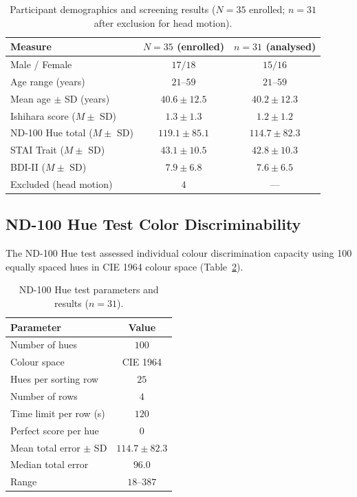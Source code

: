 \documentclass[11pt]{article}
\begin{document}
\begin{table}[H]
\centering
\caption{Participant demographics and screening results ($N = 35$ enrolled; $n = 31$ after exclusion for head motion).}
\label{tab:demographics}
\begin{tabular}{lcc}
\toprule
Measure & $N = 35$ (enrolled) & $n = 31$ (analysed) \\
\midrule
Male / Female & $17 / 18$ & $15 / 16$ \\
Age range (years) & $21$--$59$ & $21$--$59$ \\
Mean age $\pm$ SD (years) & $40.6 \pm 12.5$ & $40.2 \pm 12.3$ \\
Ishihara score ($M \pm$ SD) & $1.3 \pm 1.3$ & $1.2 \pm 1.2$ \\
ND-100 Hue total ($M \pm$ SD) & $119.1 \pm 85.1$ & $114.7 \pm 82.3$ \\
STAI Trait ($M \pm$ SD) & $43.1 \pm 10.5$ & $42.8 \pm 10.3$ \\
BDI-II ($M \pm$ SD) & $7.9 \pm 6.8$ & $7.6 \pm 6.5$ \\
Excluded (head motion) & $4$ & --- \\
\bottomrule
\end{tabular}
\end{table}

\subsection{ND-100 Hue Test Color Discriminability}

The ND-100 Hue test \citep{harada2020color} assessed individual colour discrimination capacity using 100 equally spaced hues in CIE 1964 colour space (Table~\ref{tab:huetest}).

\begin{table}[H]
\centering
\caption{ND-100 Hue test parameters and results ($n = 31$).}
\label{tab:huetest}
\begin{tabular}{lc}
\toprule
Parameter & Value \\
\midrule
Number of hues & $100$ \\
Colour space & CIE 1964 \\
Hues per sorting row & $25$ \\
Number of rows & $4$ \\
Time limit per row (s) & $120$ \\
Perfect score per hue & $0$ \\
Mean total error $\pm$ SD & $114.7 \pm 82.3$ \\
Median total error & $96.0$ \\
Range & $18$--$387$ \\
\bottomrule
\end{tabular}
\end{table}
\end{document}
